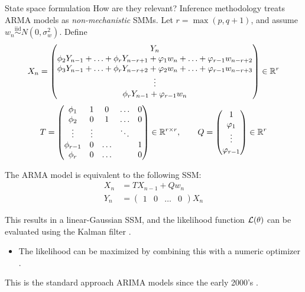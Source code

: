 \documentclass[aspectratio=169]{beamer}\usepackage[]{graphicx}\usepackage[]{xcolor}
\begin{document}
\begin{frame}[allowframebreaks]{State space formulation}
  How are they relevant? Inference methodology treats $\mathrm{ARMA}$ models as \emph{non-mechanistic} SMMs. Let $r = \max(p, q+1)$, and assume $w_n \overset{\mathrm{iid}}{\sim} N(0, \sigma^2_w)$. Define
  \begin{equation*}
    X_n = \begin{pmatrix}
  Y_n \\
  \phi_2 Y_{n - 1} + \ldots + \phi_r Y_{n - r + 1} + \varphi_{1}w_{n} + \ldots + \varphi_{r - 1}w_{n - r + 2} \\
    \phi_3 Y_{n - 1} + \ldots + \phi_r Y_{n - r + 2} + \varphi_{2}w_{n} + \ldots + \varphi_{r - 1}w_{n - r + 3} \\
    \vdots \\
    \phi_r Y_{n - 1} + \varphi_{r - 1}w_n
  \end{pmatrix} \in \mathbb{R}^r
  \end{equation*}
  \begin{equation*}
  T = \begin{pmatrix}
\phi_1 & 1 & 0 & \ldots & 0 \\
\phi_2 & 0 & 1 & \ldots & 0 \\
\vdots & \vdots & & \ddots & \\
\phi_{r-1} & 0 & \ldots &  & 1 \\
\phi_r & 0 & \ldots & & 0
\end{pmatrix} \in \mathbb{R}^{r \times r}, \quad\quad
Q = \begin{pmatrix}
  1 \\ \varphi_1 \\ \vdots \\ \varphi_{r - 1}
\end{pmatrix} \in \mathbb{R}^r
  \end{equation*}

The $\mathrm{ARMA}$ model is equivalent to the following SSM:
\begin{align*}
  X_n &= TX_{n - 1} + Qw_n \\
  Y_n &= \begin{pmatrix} 1 & 0 & \ldots & 0\end{pmatrix} X_n
\end{align*}

This results in a linear-Gaussian SSM, and the likelihood function $\mathcal{L}(\theta)$ can be evaluated using the Kalman filter \citep{kalman60}.
\begin{itemize}
  \item The likelihood can be maximized by combining this with a numeric optimizer \citep{gardner1980}.
\end{itemize}

This is the standard approach ARIMA models since the early 2000's \citep{ripley2002}. 

\end{frame}
\end{document}
